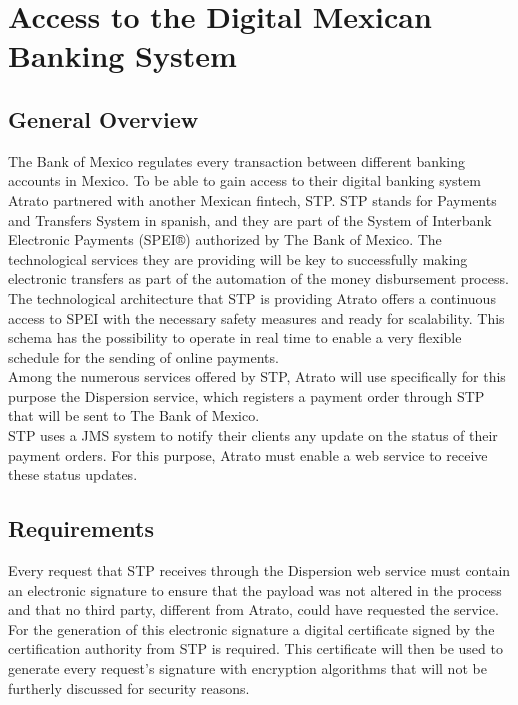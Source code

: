 \chapter{Access to the Digital Mexican Banking System}

\section{General Overview}

The Bank of Mexico regulates every transaction between different banking accounts in Mexico. To be able to gain access to their digital banking system Atrato partnered with another Mexican fintech, STP. STP stands for Payments and Transfers System in spanish, and they are part of the System of Interbank Electronic Payments (SPEI®) authorized by The Bank of Mexico. The technological services they are providing will be key to successfully making electronic transfers as part of the automation of the money disbursement process. \cite{spei}\\

The technological architecture that STP is providing Atrato offers a continuous access to SPEI with the necessary safety measures and ready for scalability. This schema has the possibility to operate in real time to enable a very flexible schedule for the sending of online payments.\\

Among the numerous services offered by STP, Atrato will use specifically for this purpose the Dispersion service, which registers a payment order through STP that will be sent to The Bank of Mexico.\\

STP uses a JMS system to notify their clients any update on the status of their payment orders. For this purpose, Atrato must enable a web service to receive these status updates.

\section{Requirements}

Every request that STP receives through the Dispersion web service must contain an electronic signature to ensure that the payload was not altered in the process and that no third party, different from Atrato, could have requested the service.\\

For the generation of this electronic signature a digital certificate signed by the certification authority from STP is required. This certificate will then be used to generate every request’s signature with encryption algorithms that will not be furtherly discussed for security reasons.\\

